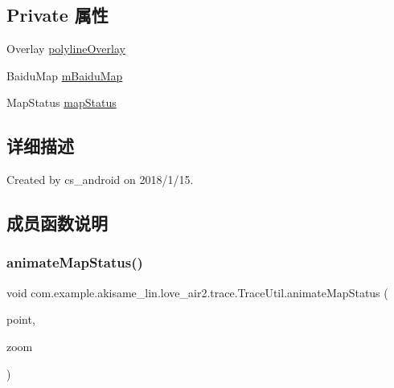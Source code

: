 \subsection*{Private 属性}
\begin{DoxyCompactItemize}
\item 
Overlay \mbox{\hyperlink{classcom_1_1example_1_1akisame__lin_1_1love__air2_1_1trace_1_1_trace_util_a45b7fa4b50ef03b6f197f600dd7a4fcc}{polyline\+Overlay}}
\item 
Baidu\+Map \mbox{\hyperlink{classcom_1_1example_1_1akisame__lin_1_1love__air2_1_1trace_1_1_trace_util_a1969b78bd5571f34bb386512211255c6}{m\+Baidu\+Map}}
\item 
Map\+Status \mbox{\hyperlink{classcom_1_1example_1_1akisame__lin_1_1love__air2_1_1trace_1_1_trace_util_aac3c71aef41b8930b5129e511e644ec4}{map\+Status}}
\end{DoxyCompactItemize}


\subsection{详细描述}
Created by cs\+\_\+android on 2018/1/15. 

\subsection{成员函数说明}
\mbox{\label{classcom_1_1example_1_1akisame__lin_1_1love__air2_1_1trace_1_1_trace_util_a92503eee73e5103a40d0a1ad80159f68}} 
\subsubsection{\texorpdfstring{animateMapStatus()}{animateMapStatus()}\hspace{0.1cm}{\footnotesize\ttfamily [1/2]}}
{\footnotesize\ttfamily void com.\+example.\+akisame\+\_\+lin.\+love\+\_\+air2.\+trace.\+Trace\+Util.\+animate\+Map\+Status (\begin{DoxyParamCaption}\item[{Lat\+Lng}]{point,  }\item[{float}]{zoom }\end{DoxyParamCaption})\hspace{0.3cm}{\ttfamily [inline]}}

